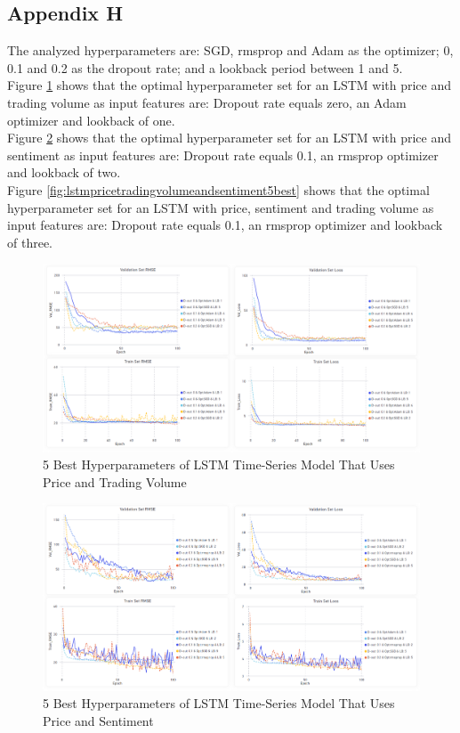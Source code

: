 \documentclass[11pt, a4paper]{article}
\begin{document}
\subsection{Appendix H}
\label{appendix:Graphics}
The analyzed hyperparameters are: SGD, rmsprop and Adam as the optimizer; 0, 0.1 and 0.2 as the dropout rate; and a lookback period between 1 and 5. \\
Figure \ref{fig:lstmpricetradingvolume5best} shows that the optimal hyperparameter set for an LSTM with price and trading
volume as input features are: Dropout rate equals zero, an Adam optimizer and lookback of one.\\
Figure \ref{fig:lstmpricenotradingvolume5best} shows that the optimal hyperparameter set for an LSTM with price and
sentiment as input features are: Dropout rate equals 0.1, an rmsprop optimizer and lookback of two.\\
Figure \ref{fig:lstmpricetradingvolumeandsentiment5best} shows that the optimal hyperparameter set for an LSTM with price,
sentiment and trading volume as input features are: Dropout rate equals 0.1, an rmsprop optimizer and lookback of three.


\begin{figure}[!h]
    \centering
    \includegraphics[width=\textwidth]{Only_Trading_Volume.png}
    \caption{5 Best Hyperparameters of LSTM Time-Series Model That Uses Price and Trading Volume}
    \label{fig:lstmpricetradingvolume5best}
\end{figure}

\begin{figure}[!h]
    \centering
    \includegraphics[width=\textwidth]{Only_Sentiment.png}
    \caption{5 Best Hyperparameters of LSTM Time-Series Model That Uses Price and Sentiment}
    \label{fig:lstmpricenotradingvolume5best}
\end{figure}
\end{document}
